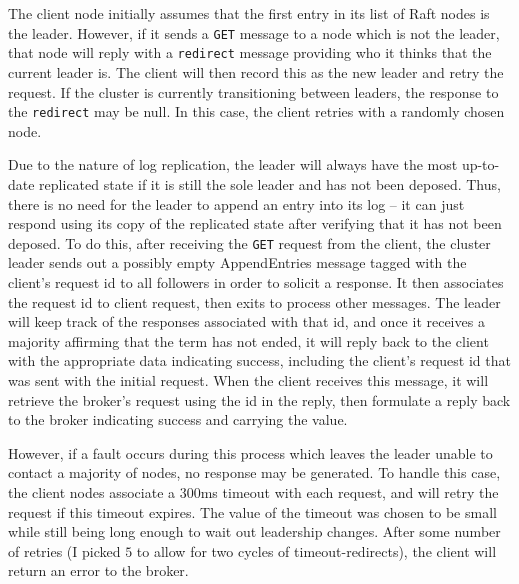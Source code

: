 \documentclass[psamsfonts]{amsart}
\begin{document}
The client node initially assumes that the first entry in its list of Raft nodes is the leader. However, if it sends a \verb|GET| message to a node which is not the leader, that node will reply with a \verb|redirect| message providing who it thinks that the current leader is. The client will then record this as the new leader and retry the request. If the cluster is currently transitioning between leaders, the response to the \verb|redirect| may be null. In this case, the client retries with a randomly chosen node.

Due to the nature of log replication, the leader will always have the most up-to-date replicated state if it is still the sole leader and has not been deposed. Thus, there is no need for the leader to append an entry into its log -- it can just respond using its copy of the replicated state after verifying that it has not been deposed. To do this, after receiving the \verb|GET| request from the client, the cluster leader sends out a possibly empty AppendEntries message tagged with the client's request id to all followers in order to solicit a response. It then associates the request id to client request, then exits to process other messages. The leader will keep track of the responses associated with that id, and once it receives a majority affirming that the term has not ended, it will reply back to the client with the appropriate data indicating success, including the client's request id that was sent with the initial request. When the client receives this message, it will retrieve the broker's request using the id in the reply, then formulate a reply back to the broker indicating success and carrying the value.

However, if a fault occurs during this process which leaves the leader unable to contact a majority of nodes, no response may be generated. To handle this case, the client nodes associate a $300$ms timeout with each request, and will retry the request if this timeout expires. The value of the timeout was chosen to be small while still being long enough to wait out leadership changes. After some number of retries (I picked $5$ to allow for two cycles of timeout-redirects), the client will return an error to the broker. 
\end{document}
